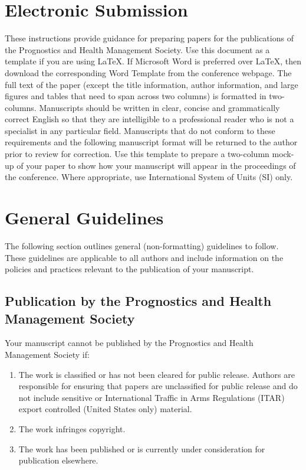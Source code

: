 \documentclass[IJPHM, 2014, 00]{PHMSociety}
\begin{document}
\section{Electronic Submission}
\label{sec:electr-subm} 
These instructions provide guidance for preparing papers for the publications of the Prognostics and Health Management Society. Use this document as a template if you are using \LaTeX. If Microsoft Word is preferred over \LaTeX, then download the corresponding Word Template from the conference webpage. The full text of the paper (except the title information, author information, and large figures and tables that need to span across two columns) is formatted in two-columns. Manuscripts should be written in clear, concise and grammatically correct English so that they are intelligible to a professional reader who is not a specialist in any particular field. Manuscripts that do not conform to these requirements and the following manuscript format will be returned to the author prior to review for correction. 
Use this template to prepare a two-column mock-up of your paper to show how your manuscript will appear in the proceedings of the conference. Where appropriate, use International System of Units (SI) only.


\section{General Guidelines}
The following section outlines general (non-formatting) guidelines to follow. These guidelines are applicable to all authors and include information on the policies and practices relevant to the publication of your manuscript.

\subsection{Publication by the Prognostics and Health Management Society}
Your manuscript cannot be published by the Prognostics and Health Management Society if:

\begin{enumerate}
	\item The work is classified or has not been cleared for public release. Authors are responsible for ensuring that papers are unclassified for public release and do not include sensitive or International Traffic in Arms Regulations (ITAR) export controlled (United States only) material.
	\item The work infringes copyright.
	\item The work has been published or is currently under consideration for publication elsewhere.
\end{enumerate}
\end{document}
